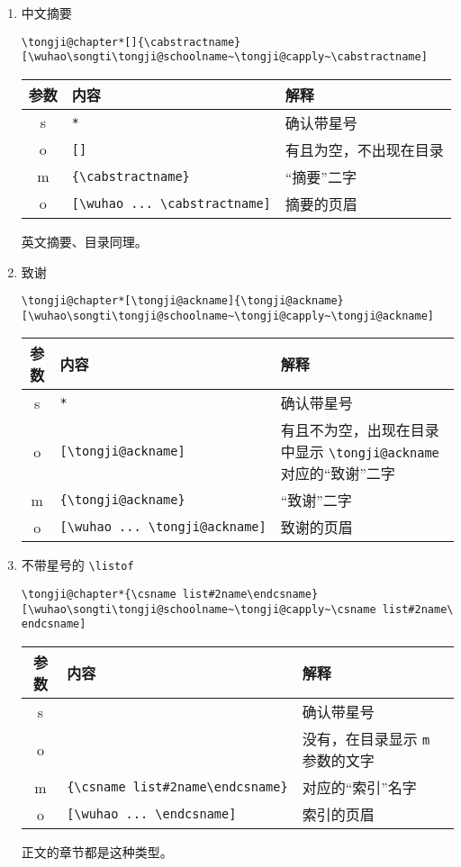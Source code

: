 \documentclass[../Main/thesis.tex]{subfiles}
\begin{document}
\begin{enumerate}
\def\labelenumi{\arabic{enumi}.}
\item
  中文摘要

  \texttt{\textbackslash{}tongji@chapter*{[}{]}\{\textbackslash{}cabstractname\}{[}\textbackslash{}wuhao\textbackslash{}songti\textbackslash{}tongji@schoolname\textasciitilde{}\textbackslash{}tongji@capply\textasciitilde{}\textbackslash{}cabstractname{]}}

  \begin{longtable}[]{@{}cll@{}}
  \toprule
  参数 & 内容 & 解释\tabularnewline
  \midrule
  \endhead
  s & \texttt{*} & 确认带星号\tabularnewline
  o & \texttt{{[}{]}} & 有且为空，不出现在目录\tabularnewline
  m & \texttt{\{\textbackslash{}cabstractname\}} &
  ``摘要''二字\tabularnewline
  o &
  \texttt{{[}\textbackslash{}wuhao\ ...\ \textbackslash{}cabstractname{]}}
  & 摘要的页眉\tabularnewline
  \bottomrule
  \end{longtable}

  英文摘要、目录同理。
\item
  致谢

  \texttt{\textbackslash{}tongji@chapter*{[}\textbackslash{}tongji@ackname{]}\{\textbackslash{}tongji@ackname\}{[}\textbackslash{}wuhao\textbackslash{}songti\textbackslash{}tongji@schoolname\textasciitilde{}\textbackslash{}tongji@capply\textasciitilde{}\textbackslash{}tongji@ackname{]}}

  \begin{longtable}[]{@{}cll@{}}
  \toprule
  参数 & 内容 & 解释\tabularnewline
  \midrule
  \endhead
  s & \texttt{*} & 确认带星号\tabularnewline
  o & \texttt{{[}\textbackslash{}tongji@ackname{]}} &
  有且不为空，出现在目录中显示 \texttt{\textbackslash{}tongji@ackname}
  对应的``致谢''二字\tabularnewline
  m & \texttt{\{\textbackslash{}tongji@ackname\}} &
  ``致谢''二字\tabularnewline
  o &
  \texttt{{[}\textbackslash{}wuhao\ ...\ \textbackslash{}tongji@ackname{]}}
  & 致谢的页眉\tabularnewline
  \bottomrule
  \end{longtable}
\item
  不带星号的 \texttt{\textbackslash{}listof}

  \texttt{\textbackslash{}tongji@chapter*\{\textbackslash{}csname\ list\#2name\textbackslash{}endcsname\}{[}\textbackslash{}wuhao\textbackslash{}songti\textbackslash{}tongji@schoolname\textasciitilde{}\textbackslash{}tongji@capply\textasciitilde{}\textbackslash{}csname\ list\#2name\textbackslash{}endcsname{]}}

  \begin{longtable}[]{@{}cll@{}}
  \toprule
  参数 & 内容 & 解释\tabularnewline
  \midrule
  \endhead
  s & & 确认带星号\tabularnewline
  o & & 没有，在目录显示 \texttt{m} 参数的文字\tabularnewline
  m &
  \texttt{\{\textbackslash{}csname\ list\#2name\textbackslash{}endcsname\}}
  & 对应的``索引''名字\tabularnewline
  o &
  \texttt{{[}\textbackslash{}wuhao\ ...\ \textbackslash{}endcsname{]}} &
  索引的页眉\tabularnewline
  \bottomrule
  \end{longtable}

  正文的章节都是这种类型。
\end{enumerate}
\end{document}
